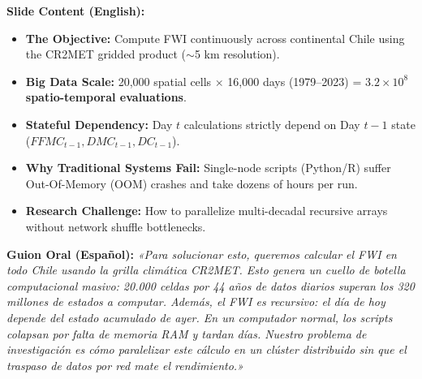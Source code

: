 \documentclass[11pt,a4paper]{article}
\begin{document}
\begin{tcolorbox}[colback=white, colframe=primaryblue, title=\textbf{Slide 3: Problem Motivation \& Systems Challenge (1:30 -- 2:45)}]
\textbf{Slide Content (English):}
\begin{itemize}[leftmargin=4mm, itemsep=1pt]
    \item \textbf{The Objective:} Compute FWI continuously across continental Chile using the CR2MET gridded product ($\sim$5 km resolution).
    \item \textbf{Big Data Scale:} 20,000 spatial cells $\times$ 16,000 days (1979--2023) = \textbf{$3.2 \times 10^8$ spatio-temporal evaluations}.
    \item \textbf{Stateful Dependency:} Day $t$ calculations strictly depend on Day $t-1$ state ($FFMC_{t-1}, DMC_{t-1}, DC_{t-1}$).
    \item \textbf{Why Traditional Systems Fail:} Single-node scripts (Python/R) suffer Out-Of-Memory (OOM) crashes and take dozens of hours per run.
    \item \textbf{Research Challenge:} How to parallelize multi-decadal recursive arrays without network shuffle bottlenecks.
\end{itemize}
\textbf{Guion Oral (Español):}
\textit{«Para solucionar esto, queremos calcular el FWI en todo Chile usando la grilla climática CR2MET. Esto genera un cuello de botella computacional masivo: 20.000 celdas por 44 años de datos diarios superan los 320 millones de estados a computar. Además, el FWI es recursivo: el día de hoy depende del estado acumulado de ayer. En un computador normal, los scripts colapsan por falta de memoria RAM y tardan días. Nuestro problema de investigación es cómo paralelizar este cálculo en un clúster distribuido sin que el traspaso de datos por red mate el rendimiento.»}
\end{tcolorbox}
\end{document}
